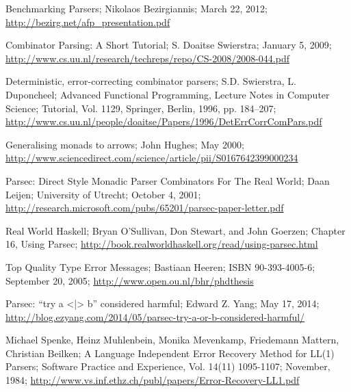 \begin{thebibliography}{99}
\begin{multicols}{2}
	Benchmarking Parsers;
	Nikolaos Bezirgiannis;
	March 22, 2012;
	\url{http://bezirg.net/afp_presentation.pdf}

  Combinator Parsing: A Short Tutorial;
  S. Doaitse Swierstra;
  January 5, 2009;
  \url{http://www.cs.uu.nl/research/techreps/repo/CS-2008/2008-044.pdf}

	Deterministic, error-correcting combinator parsers;
	S.D. Swierstra, L. Duponcheel;
	Advanced Functional Programming, Lecture Notes in Computer Science;
	Tutorial, Vol. 1129, Springer, Berlin, 1996, pp. 184--207;
	\url{http://www.cs.uu.nl/people/doaitse/Papers/1996/DetErrCorrComPars.pdf}

	Generalising monads to arrows;
	John Hughes;
	May 2000;
	\url{http://www.sciencedirect.com/science/article/pii/S0167642399000234}

	Parsec: Direct Style Monadic Parser Combinators For The Real World;
	Daan Leijen;
	University of Utrecht;
	October 4, 2001;
	\url{http://research.microsoft.com/pubs/65201/parsec-paper-letter.pdf}

	Real World Haskell;
	Bryan O'Sullivan, Don Stewart, and John Goerzen;
	Chapter 16, Using Parsec;
	\url{http://book.realworldhaskell.org/read/using-parsec.html}

	Top Quality Type Error Messages;
	Bastiaan Heeren;
	ISBN 90-393-4005-6;
	September 20, 2005;
	\url{http://www.open.ou.nl/bhr/phdthesis}

	Parsec: ``try a <|> b'' considered harmful;
	Edward Z. Yang;
	May 17, 2014;
	\url{http://blog.ezyang.com/2014/05/parsec-try-a-or-b-considered-harmful/}

	Michael Spenke, Heinz Muhlenbein, Monika Mevenkamp, Friedemann Mattern, Christian Beilken;
	A Language Independent Error Recovery Method for LL(1) Parsers;
	Software Practice and Experience, Vol. 14(11) 1095-1107;
	November, 1984;
	\url{http://www.vs.inf.ethz.ch/publ/papers/Error-Recovery-LL1.pdf}


\end{multicols}

\end{thebibliography}